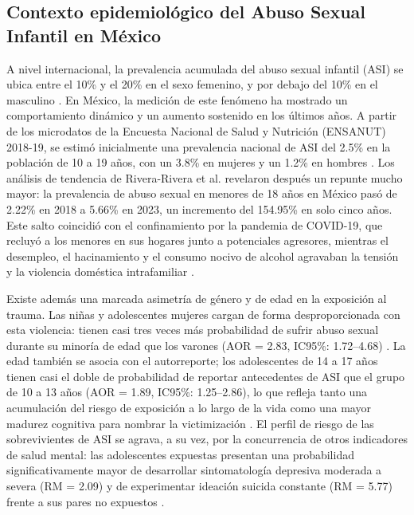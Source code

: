 \subsection{Contexto epidemiológico del Abuso Sexual Infantil en México}

A nivel internacional, la prevalencia acumulada del abuso sexual infantil (ASI) se ubica entre el 10\% y el 20\% en el sexo femenino, y por debajo del 10\% en el masculino \cite{current_barth_2013}. En México, la medición de este fenómeno ha mostrado un comportamiento dinámico y un aumento sostenido en los últimos años. A partir de los microdatos de la Encuesta Nacional de Salud y Nutrición (ENSANUT) 2018-19, se estimó inicialmente una prevalencia nacional de ASI del 2.5\% en la población de 10 a 19 años, con un 3.8\% en mujeres y un 1.2\% en hombres \cite{abuso_valdezsantiago_2020}. Los análisis de tendencia de Rivera-Rivera et al. \cite{trends_riverarivera_2025} revelaron después un repunte mucho mayor: la prevalencia de abuso sexual en menores de 18 años en México pasó de 2.22\% en 2018 a 5.66\% en 2023, un incremento del 154.95\% en solo cinco años. Este salto coincidió con el confinamiento por la pandemia de COVID-19, que recluyó a los menores en sus hogares junto a potenciales agresores, mientras el desempleo, el hacinamiento y el consumo nocivo de alcohol agravaban la tensión y la violencia doméstica intrafamiliar \cite{trends_riverarivera_2025}.

Existe además una marcada asimetría de género y de edad en la exposición al trauma. Las niñas y adolescentes mujeres cargan de forma desproporcionada con esta violencia: tienen casi tres veces más probabilidad de sufrir abuso sexual durante su minoría de edad que los varones (AOR = 2.83, IC95\%: 1.72--4.68) \cite{trends_riverarivera_2025}. La edad también se asocia con el autorreporte; los adolescentes de 14 a 17 años tienen casi el doble de probabilidad de reportar antecedentes de ASI que el grupo de 10 a 13 años (AOR = 1.89, IC95\%: 1.25--2.86), lo que refleja tanto una acumulación del riesgo de exposición a lo largo de la vida como una mayor madurez cognitiva para nombrar la victimización \cite{trends_riverarivera_2025}. El perfil de riesgo de las sobrevivientes de ASI se agrava, a su vez, por la concurrencia de otros indicadores de salud mental: las adolescentes expuestas presentan una probabilidad significativamente mayor de desarrollar sintomatología depresiva moderada a severa (RM = 2.09) y de experimentar ideación suicida constante (RM = 5.77) frente a sus pares no expuestos \cite{abuso_valdezsantiago_2020}.

